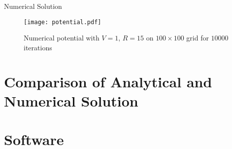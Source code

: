 \documentclass{beamer}
\begin{document}
\begin{frame}{Numerical Solution}

\begin{figure}
\begin{center}
\texttt{[image: potential.pdf]}
\caption{Numerical potential with $V=1$, $R=15$ on $100\times100$ grid for $10000$ iterations}
\label{fig:numerical}
\end{center}
\end{figure}

\end{frame}

\section{Comparison of Analytical and Numerical Solution}

\section{Software}
\end{document}
